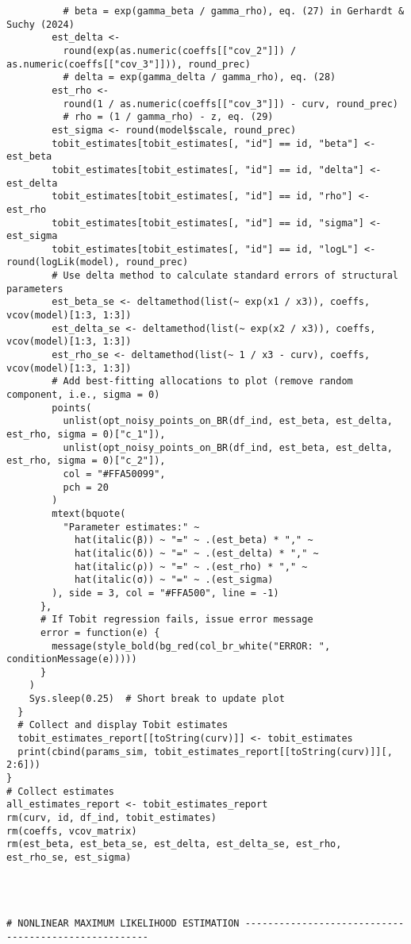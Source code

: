 \documentclass[12pt, a4paper, oneside]{article}
\theoremstyle{Plain}
\theoremstyle{Definition}
\theoremstyle{Remark}
\begin{document}
\begin{appendix}
\begin{lstlisting}
          # beta = exp(gamma_beta / gamma_rho), eq. (27) in Gerhardt & Suchy (2024)
        est_delta <-
          round(exp(as.numeric(coeffs[["cov_2"]]) / as.numeric(coeffs[["cov_3"]])), round_prec)
          # delta = exp(gamma_delta / gamma_rho), eq. (28)
        est_rho <-
          round(1 / as.numeric(coeffs[["cov_3"]]) - curv, round_prec)
          # rho = (1 / gamma_rho) - z, eq. (29)
        est_sigma <- round(model$scale, round_prec)
        tobit_estimates[tobit_estimates[, "id"] == id, "beta"] <- est_beta
        tobit_estimates[tobit_estimates[, "id"] == id, "delta"] <- est_delta
        tobit_estimates[tobit_estimates[, "id"] == id, "rho"] <- est_rho
        tobit_estimates[tobit_estimates[, "id"] == id, "sigma"] <- est_sigma
        tobit_estimates[tobit_estimates[, "id"] == id, "logL"] <- round(logLik(model), round_prec)
        # Use delta method to calculate standard errors of structural parameters
        est_beta_se <- deltamethod(list(~ exp(x1 / x3)), coeffs, vcov(model)[1:3, 1:3])
        est_delta_se <- deltamethod(list(~ exp(x2 / x3)), coeffs, vcov(model)[1:3, 1:3])
        est_rho_se <- deltamethod(list(~ 1 / x3 - curv), coeffs, vcov(model)[1:3, 1:3])
        # Add best-fitting allocations to plot (remove random component, i.e., sigma = 0)
        points(
          unlist(opt_noisy_points_on_BR(df_ind, est_beta, est_delta, est_rho, sigma = 0)["c_1"]),
          unlist(opt_noisy_points_on_BR(df_ind, est_beta, est_delta, est_rho, sigma = 0)["c_2"]),
          col = "#FFA50099",
          pch = 20
        )
        mtext(bquote(
          "Parameter estimates:" ~
            hat(italic(β)) ~ "=" ~ .(est_beta) * "," ~
            hat(italic(δ)) ~ "=" ~ .(est_delta) * "," ~
            hat(italic(ρ)) ~ "=" ~ .(est_rho) * "," ~
            hat(italic(σ)) ~ "=" ~ .(est_sigma)
        ), side = 3, col = "#FFA500", line = -1)
      },
      # If Tobit regression fails, issue error message
      error = function(e) {
        message(style_bold(bg_red(col_br_white("ERROR: ", conditionMessage(e)))))
      }
    )
    Sys.sleep(0.25)  # Short break to update plot
  }
  # Collect and display Tobit estimates
  tobit_estimates_report[[toString(curv)]] <- tobit_estimates
  print(cbind(params_sim, tobit_estimates_report[[toString(curv)]][, 2:6]))
}
# Collect estimates
all_estimates_report <- tobit_estimates_report
rm(curv, id, df_ind, tobit_estimates)
rm(coeffs, vcov_matrix)
rm(est_beta, est_beta_se, est_delta, est_delta_se, est_rho, est_rho_se, est_sigma)




# NONLINEAR MAXIMUM LIKELIHOOD ESTIMATION -----------------------------------------------------



\end{lstlisting}
\end{appendix}
\end{document}
